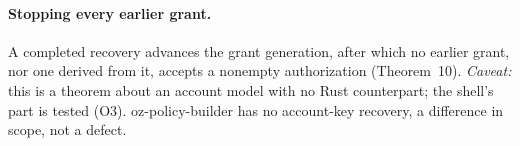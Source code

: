 \paragraph{Stopping every earlier grant.} A completed recovery advances the grant
generation, after which no earlier grant, nor one derived from it, accepts a
nonempty authorization (Theorem~10). \emph{Caveat:} this is a theorem about an
account model with no Rust counterpart; the shell's part is tested (O3).
oz-policy-builder has no account-key recovery, a difference in scope, not a
defect.
